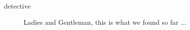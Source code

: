 
\begin{description}
\item[detective]
Ladies and Gentleman, this is what we found so far ...

\end{description}
